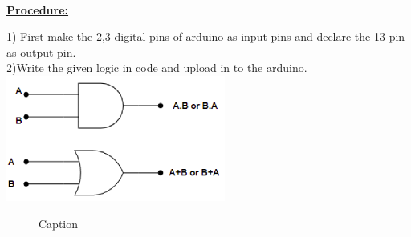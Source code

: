 \documentclass[letterpaper, 10 pt, conference]{ieeeconf}
\begin{document}
\begin{left}
\vspace{5mm}
\\ \raggedright \textbf{\underline{Procedure:}}\vspace{2mm}
\\ \raggedright 1) First make the 2,3 digital pins of arduino as input pins and declare the 13 pin as output pin.
\\ 2)Write the given logic in code and upload in to the arduino.
    \includegraphics{pic.png}
\vspace{5cm}
\begin{figure}

    \centering
    

    \caption{Caption}
    \label{fig:my_label}
\end{figure}
\vspace{5mm}



\end{left}
\end{document}
